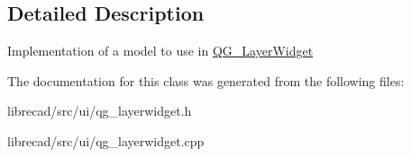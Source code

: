 \subsection{Detailed Description}
Implementation of a model to use in \hyperlink{classQG__LayerWidget}{Q\-G\-\_\-\-Layer\-Widget} 

The documentation for this class was generated from the following files\-:\begin{DoxyCompactItemize}
\item 
librecad/src/ui/qg\-\_\-layerwidget.\-h\item 
librecad/src/ui/qg\-\_\-layerwidget.\-cpp\end{DoxyCompactItemize}
